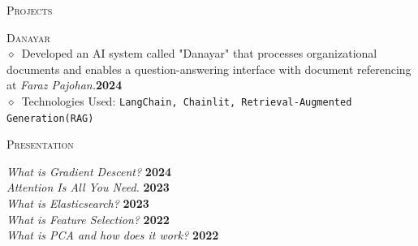 \documentclass[11pt, a4paper]{article}
\newcommand{\dates}[1]{\hfill\mbox{\textbf{#1}}} %
\newcommand{\smaller}[1]{{\small$\diamond$\ #1}}
\newcommand{\headright}[1]{\vspace*{2.5ex}\textsc{\Large\color{cvblue}#1}\par%
     \vspace*{-2ex}{\color{cvblue}\hrulefill}\par}
\begin{document}
\begin{minipage}[t]{0.56\textwidth}
\headright{Projects}
\textsc{Danayar}\\
\smaller{Developed an AI system called "Danayar" that processes organizational documents and enables a question-answering interface with document referencing at \textit{Faraz Pajohan.}}\dates{2024}\\
\smaller{Technologies Used: \texttt{LangChain, Chainlit, Retrieval-Augmented Generation(RAG)}}


\headright{Presentation}
\textit{What is Gradient Descent?} \dates{2024}\\
\textit{Attention Is All You Need.} \dates{2023}\\
\textit{What is Elasticsearch?} \dates{2023}\\
\textit{What is Feature Selection?} \dates{2022}\\
\textit{What is PCA and how does it work?} \dates{2022}

\end{minipage}
\end{document}
